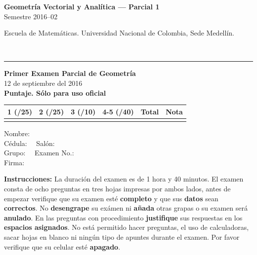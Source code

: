 \documentclass[11pt]{article}
\begin{document}
\noindent
\begin{minipage}[t]{0.6\linewidth}
{\small\bfseries Geometría Vectorial y Analítica --- Parcial 1}\\
{\small Semestre 2016--02}
\end{minipage}%
\hfill
\begin{minipage}[t]{0.35\linewidth}
\raggedleft\small Escuela de Matemáticas. Universidad Nacional de Colombia, Sede Medellín.
\end{minipage}\\[2pt]
\rule{\linewidth}{0.6pt}

\noindent
\begin{minipage}[t]{0.54\linewidth}
\textbf{Primer Examen Parcial de Geometría}\\
12 de septiembre del 2016\\[6pt]
\textbf{Puntaje. Sólo para uso oficial}

\small
\begin{tabular}{|c|c|c|c|c|c|}
\hline
1 (/25) & 2 (/25) & 3 (/10) & 4-5 (/40) & Total & Nota \\
\hline
 & & & & & \\
\hline
\end{tabular}
\end{minipage}%
\begin{minipage}[t]{0.44\linewidth}
Nombre: \underline{\hspace{4.8cm}}\\[8pt]
Cédula: \underline{\hspace{1.8cm}}\ \ Salón: \underline{\hspace{1.2cm}}\\[8pt]
Grupo: \underline{\hspace{1.8cm}}\ \ Examen No.: \underline{\hspace{1.6cm}}\\[8pt]
Firma: \underline{\hspace{4.8cm}}
\end{minipage}

\vspace{10pt}
\textbf{Instrucciones:} La duración del examen es de 1 hora y 40 minutos. El examen consta de ocho preguntas en tres hojas impresas por ambos lados, antes de empezar verifique que su examen esté \textbf{completo} y que sus \textbf{datos} sean \textbf{correctos}. No \textbf{desengrape} su exámen ni \textbf{añada} otras grapas o su examen será \textbf{anulado}. En las preguntas con procedimiento \textbf{justifique} sus respuestas en los \textbf{espacios asignados}. No está permitido hacer preguntas, el uso de calculadoras, sacar hojas en blanco ni ningún tipo de apuntes durante el examen. Por favor verifique que su celular esté \textbf{apagado}.
\end{document}
